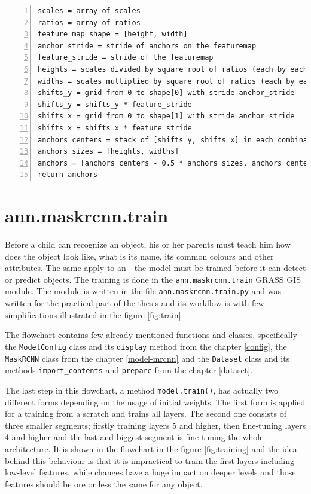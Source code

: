 {\scriptsize
\begin{lstlisting}[style=python, caption={generate\_anchors}, captionpos=b, label=code:anchors, deletekeywords={range, from, map, in},
backgroundcolor = \color{light-gray}, numbers=left, breaklines=true]
scales = array of scales
ratios = array of ratios
feature_map_shape = [height, width]
anchor_stride = stride of anchors on the featuremap
feature_stride = stride of the featuremap
heights = scales divided by square root of ratios (each by each)
widths = scales multiplied by square root of ratios (each by each)
shifts_y = grid from 0 to shape[0] with stride anchor_stride
shifts_y = shifts_y * feature_stride
shifts_x = grid from 0 to shape[1] with stride anchor_stride
shifts_x = shifts_x * feature_stride
anchors_centers = stack of [shifts_y, shifts_x] in each combination
anchors_sizes = [heights, widths]
anchors = [anchors_centers - 0.5 * anchors_sizes, anchors_centers + 0.5 * anchors_sizes]
return anchors
\end{lstlisting}}

\section{ann.maskrcnn.train}
\label{train-module}

Before a child can recognize an object, his or her parents must teach him how does the object look like, what is its name, its common colours and other attributes. The same apply to an  - the model must be trained before it can detect or predict objects. The training is done in the \verb|ann.maskrcnn.train| GRASS GIS module. The module is written in the file \verb|ann.maskrcnn.train.py| and was written for the practical part of the thesis and its workflow is with few simplifications illustrated in the figure \ref{fig:train}.

The flowchart contains few already-mentioned functions and classes, specifically the \verb|ModelConfig| class and its \verb|display| method from the chapter \ref{config}, the \verb|MaskRCNN| class from the chapter \ref{model-mrcnn} and the \verb|Dataset| class and its methods \verb|import_contents| and \verb|prepare| from the chapter \ref{dataset}.

The last step in this flowchart, a method \verb|model.train()|, has actually two different forms depending on the usage of initial weights. The first form is applied for a training from a scratch and trains all layers. The second one consists of three smaller segments; firstly training layers 5 and higher, then fine-tuning layers 4 and higher and the last and biggest segment is fine-tuning the whole architecture. It is shown in the flowchart in the figure \ref{fig:training} and the idea behind this behaviour is that it is impractical to train the first layers including low-level features, while changes have a huge impact on deeper levels and those features should be ore or less the same for any object.

